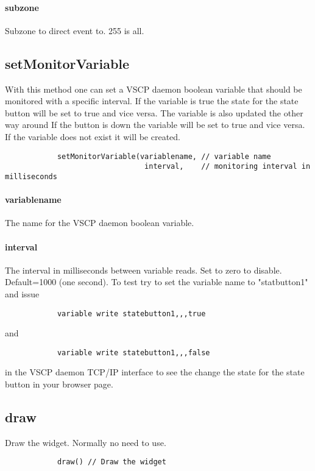 \documentclass{article}
\begin{document}
        \paragraph*{subzone}
        Subzone to direct event to. 255 is all.
        
        \subsection*{setMonitorVariable}
        With this method one can set a VSCP daemon boolean variable that should
        be monitored with a specific interval. If the variable is true the state for
        the state button will be set to true and vice versa. The variable is also
        updated the other way around
        If the button is down the variable will 
        be set to true and vice versa. If the variable does not exist it will be 
        created.
        \begin{verbatim}
            setMonitorVariable(variablename, // variable name
                                interval,    // monitoring interval in milliseconds
        \end{verbatim}
        \paragraph*{variablename}
        The name for the VSCP daemon boolean variable.
        \paragraph*{interval}
        The interval in milliseconds between variable reads. Set to zero to disable.
        Default=1000 (one second).
        To test try to set the variable name to "statbutton1" and issue
        \begin{verbatim}
            variable write statebutton1,,,true
        \end{verbatim}
        and
        \begin{verbatim}
            variable write statebutton1,,,false
        \end{verbatim}
        in the VSCP daemon TCP/IP interface to see the change the state for the state 
        button in your browser page.
        
                
        \subsection*{draw}
        Draw the widget. Normally no need to use.
        \begin{verbatim}
            draw() // Draw the widget
        \end{verbatim}
        
\end{document}
